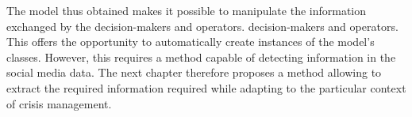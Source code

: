 The model thus obtained makes it possible to manipulate the information exchanged by the decision-makers and operators.
decision-makers and operators.
This offers the opportunity to automatically create instances of the model's classes.
However, this requires a method
capable of detecting information in the social media data.
The next chapter therefore proposes a method allowing to extract the required information required while adapting to the particular context of crisis management.

